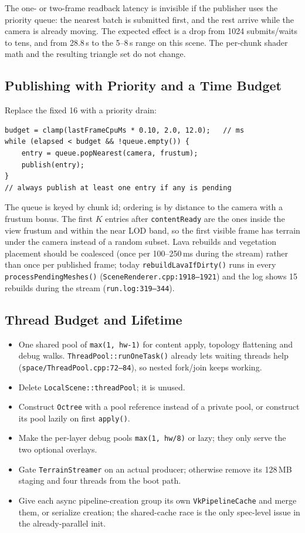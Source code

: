 \documentclass[11pt,a4paper]{article}
\begin{document}
The one- or two-frame readback latency is invisible if the publisher uses the
priority queue: the nearest batch is submitted first, and the rest arrive
while the camera is already moving. The expected effect is a drop from 1024
submits/waits to tens, and from 28.8\,s to the 5--8\,s range on this scene.
The per-chunk shader math and the resulting triangle set do not change.

\subsection{Publishing with Priority and a Time Budget}

Replace the fixed 16 with a priority drain:

\begin{lstlisting}
budget = clamp(lastFrameCpuMs * 0.10, 2.0, 12.0);   // ms
while (elapsed < budget && !queue.empty()) {
    entry = queue.popNearest(camera, frustum);
    publish(entry);
}
// always publish at least one entry if any is pending
\end{lstlisting}

The queue is keyed by chunk id; ordering is by distance to the camera with a
frustum bonus. The first $K$ entries after \texttt{contentReady} are the ones
inside the view frustum and within the near LOD band, so the first visible
frame has terrain under the camera instead of a random subset. Lava rebuilds
and vegetation placement should be coalesced (once per 100--250\,ms during
the stream) rather than once per published frame; today
\texttt{rebuildLavaIfDirty()} runs in every \texttt{processPendingMeshes()}
(\texttt{SceneRenderer.cpp:1918--1921}) and the log shows 15 rebuilds during
the stream (\texttt{run.log:319--344}).

\subsection{Thread Budget and Lifetime}

\begin{itemize}[leftmargin=1.4em,itemsep=2pt]
\item One shared pool of \texttt{max(1, hw-1)} for content apply, topology
flattening and debug walks. \texttt{ThreadPool::runOneTask()} already lets
waiting threads help (\texttt{space/ThreadPool.cpp:72--84}), so nested
fork/join keeps working.
\item Delete \texttt{LocalScene::threadPool}; it is unused.
\item Construct \texttt{Octree} with a pool reference instead of a private
pool, or construct its pool lazily on first \texttt{apply()}.
\item Make the per-layer debug pools \texttt{max(1, hw/8)} or lazy; they only
serve the two optional overlays.
\item Gate \texttt{TerrainStreamer} on an actual producer; otherwise remove
its 128\,MB staging and four threads from the boot path.
\item Give each async pipeline-creation group its own \texttt{VkPipelineCache}
and merge them, or serialize creation; the shared-cache race is the only
spec-level issue in the already-parallel init.
\end{itemize}
\end{document}
